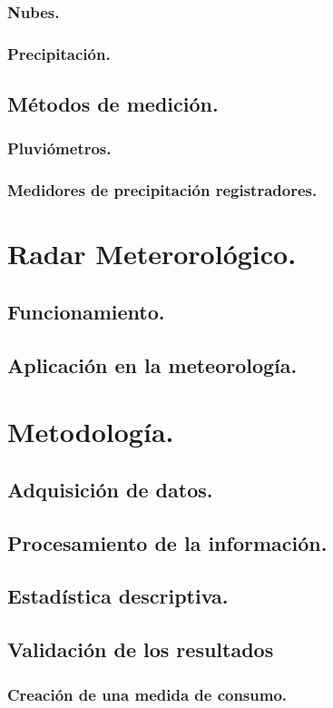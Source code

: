 \documentclass[letterpaper,12pt,oneside]{book}
\begin{document}
        \subsection{Nubes.}
        \subsection{Precipitación.}
    \section{Métodos de medición.}
        \subsection{Pluviómetros.}
        \subsection{Medidores de precipitación registradores.}
\chapter{Radar Meterorológico.}
    \section{Funcionamiento.}
    \section{Aplicación en la meteorología.}
\chapter{Metodología.}
    \section{Adquisición de datos.}
    \section{Procesamiento de la información.}
    \section{Estadística descriptiva.}
    \section{Validación de los resultados}
        \subsection{Creación de una medida de consumo.}
\end{document}
